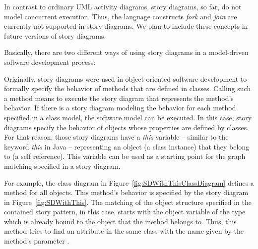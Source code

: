 In contrast to ordinary UML activity diagrams, story diagrams, so far, do not model concurrent execution.
Thus, the language constructs \emph{fork} and \emph{join} are currently not supported in story diagrams.
We plan to include these concepts in future versions of story diagrams.


Basically, there are two different ways of using story diagrams in a model-driven software development process:

Originally, story diagrams were used in object-oriented software development to formally specify the behavior of methods that are defined in classes.
Calling such a method means to execute the story diagram that represents the method's behavior.
If there is a story diagram modeling the behavior for each method specified in a class model, the software model can be executed.
In this case, story diagrams specify the behavior of objects whose properties are defined by classes.
For that reason, those story diagrams have a \emph{this} variable -- similar to the keyword \emph{this} in Java -- representing an object (a class instance) that they belong to (a self reference).
This variable can be used as a starting point for the graph matching specified in a story diagram.

For example, the class diagram in Figure~\ref{fig:SDWithThisClassDiagram} defines a method  for all  objects.
This method's behavior is specified by the story diagram in Figure~\ref{fig:SDWithThis}.
The matching of the object structure specified in the contained story pattern, in this case,
starts with the  object variable of the type  which is already bound
to the  object that the  method belongs to.
Thus, this method tries to find an attribute  in the same class with the name given by the method's parameter .

